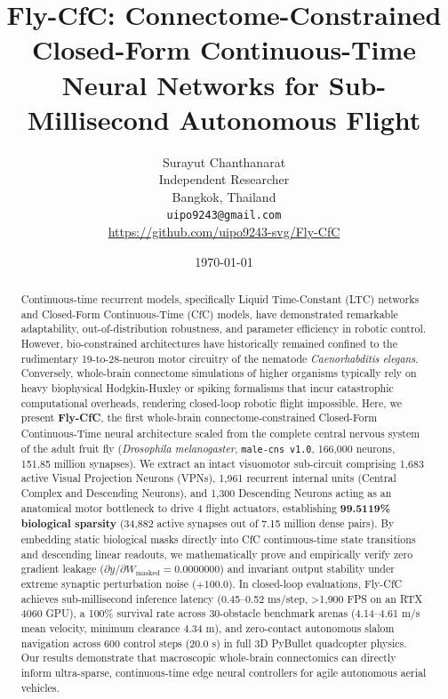 \documentclass{article}
\title{Fly-CfC: Connectome-Constrained Closed-Form Continuous-Time Neural Networks for Sub-Millisecond Autonomous Flight}
\date{\today}
\author{
  Surayut Chanthanarat \\
  Independent Researcher \\
  Bangkok, Thailand \\
  \texttt{uipo9243@gmail.com} \\
  \href{https://github.com/uipo9243-svg/Fly-CfC}{https://github.com/uipo9243-svg/Fly-CfC}
}
\begin{document}
\maketitle

\begin{abstract}
Continuous-time recurrent models, specifically Liquid Time-Constant (LTC) networks and Closed-Form Continuous-Time (CfC) models, have demonstrated remarkable adaptability, out-of-distribution robustness, and parameter efficiency in robotic control. However, bio-constrained architectures have historically remained confined to the rudimentary 19-to-28-neuron motor circuitry of the nematode \emph{Caenorhabditis elegans}. Conversely, whole-brain connectome simulations of higher organisms typically rely on heavy biophysical Hodgkin-Huxley or spiking formalisms that incur catastrophic computational overheads, rendering closed-loop robotic flight impossible. Here, we present \textbf{Fly-CfC}, the first whole-brain connectome-constrained Closed-Form Continuous-Time neural architecture scaled from the complete central nervous system of the adult fruit fly (\emph{Drosophila melanogaster}, \texttt{male-cns v1.0}, 166,000 neurons, 151.85 million synapses). We extract an intact visuomotor sub-circuit comprising 1,683 active Visual Projection Neurons (VPNs), 1,961 recurrent internal units (Central Complex and Descending Neurons), and 1,300 Descending Neurons acting as an anatomical motor bottleneck to drive 4 flight actuators, establishing \textbf{99.5119\% biological sparsity} (34,882 active synapses out of 7.15 million dense pairs). By embedding static biological masks directly into CfC continuous-time state transitions and descending linear readouts, we mathematically prove and empirically verify zero gradient leakage ($\partial y / \partial W_{\text{masked}} = 0.0000000$) and invariant output stability under extreme synaptic perturbation noise ($+100.0$). In closed-loop evaluations, Fly-CfC achieves sub-millisecond inference latency (0.45--0.52 ms/step, >1,900 FPS on an RTX 4060 GPU), a 100\% survival rate across 30-obstacle benchmark arenas (4.14--4.61 m/s mean velocity, minimum clearance 4.34 m), and zero-contact autonomous slalom navigation across 600 control steps (20.0 s) in full 3D PyBullet quadcopter physics. Our results demonstrate that macroscopic whole-brain connectomics can directly inform ultra-sparse, continuous-time edge neural controllers for agile autonomous aerial vehicles.
\end{abstract}

\end{document}
